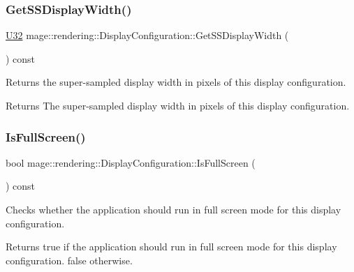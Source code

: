 \subsubsection{\texorpdfstring{Get\+S\+S\+Display\+Width()}{GetSSDisplayWidth()}}
{\footnotesize\ttfamily \mbox{\hyperlink{namespacemage_a41c104c036fba3756a74e19f793eeaa1}{U32}} mage\+::rendering\+::\+Display\+Configuration\+::\+Get\+S\+S\+Display\+Width (\begin{DoxyParamCaption}{ }\end{DoxyParamCaption}) const\hspace{0.3cm}{\ttfamily [noexcept]}}

Returns the super-\/sampled display width in pixels of this display configuration.

\begin{DoxyReturn}{Returns}
The super-\/sampled display width in pixels of this display configuration. 
\end{DoxyReturn}
\mbox{\label{classmage_1_1rendering_1_1_display_configuration_a507e755923af2ba1338cc041b5df8e0a}} 
\subsubsection{\texorpdfstring{Is\+Full\+Screen()}{IsFullScreen()}}
{\footnotesize\ttfamily bool mage\+::rendering\+::\+Display\+Configuration\+::\+Is\+Full\+Screen (\begin{DoxyParamCaption}{ }\end{DoxyParamCaption}) const\hspace{0.3cm}{\ttfamily [noexcept]}}

Checks whether the application should run in full screen mode for this display configuration.

\begin{DoxyReturn}{Returns}
{\ttfamily true} if the application should run in full screen mode for this display configuration. {\ttfamily false} otherwise. 
\end{DoxyReturn}
\mbox{\label{classmage_1_1rendering_1_1_display_configuration_a6447404f1d720b98b37f684ba0e790a0}} 
